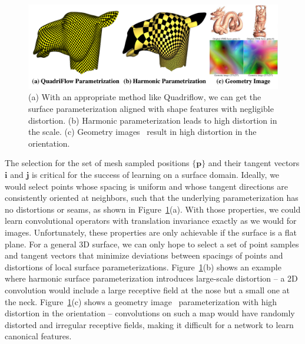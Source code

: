  \begin{figure}
    \centering
     \includegraphics[width=\linewidth]{texturenet/param/param.pdf}
     \caption{(a) With an appropriate method like Quadriflow, we can get the surface parameterization aligned with shape features with negligible distortion. (b) Harmonic parameterization leads to high distortion in the scale. (c) Geometry images~\cite{gu2002geometry} result in high distortion in the orientation.}
     \label{fig:texturenet-param}
 \end{figure}
The selection for the set of mesh sampled positions $\{\mathbf{p}\}$ and their tangent vectors $\mathbf{i}$ and $\mathbf{j}$ is critical for the success of learning on a surface domain.  Ideally, we would select points whose spacing is uniform and whose tangent directions are consistently oriented at neighbors, such that the underlying parameterization has no distortions or seams, as shown in Figure~\ref{fig:texturenet-param}(a).  With those properties, we could learn convolutional operators with translation invariance exactly as we would for images.  Unfortunately, these properties are only achievable if the surface is a flat plane.   
For a general 3D surface, we can only hope to select a set of point samples and tangent vectors that minimize deviations between spacings of points and distortions of local surface parameterizations. Figure~\ref{fig:texturenet-param}(b) shows an example where harmonic surface parameterization introduces large-scale distortion -- a 2D convolution would include a large receptive field at the nose but a small one at the neck. Figure~\ref{fig:texturenet-param}(c) shows a geometry image~\cite{gu2002geometry} parameterization with high distortion in the orientation -- convolutions on such a map would have randomly distorted and irregular receptive fields, making it difficult for a network to learn canonical features.

